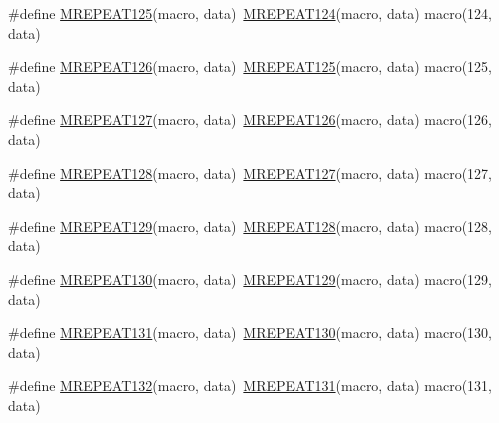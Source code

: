 \begin{DoxyCompactItemize}
\item 
\#define \mbox{\hyperlink{group__group__sam0__utils__mrepeat_ga7396c439515bd5514d070147e165690a}{M\+R\+E\+P\+E\+A\+T125}}(macro,  data)~\mbox{\hyperlink{group__group__sam0__utils__mrepeat_gaffd8596b4b1da63e7fa64cdeb5c91dd0}{M\+R\+E\+P\+E\+A\+T124}}(macro, data)   macro(124, data)
\item 
\#define \mbox{\hyperlink{group__group__sam0__utils__mrepeat_ga53040b0cd4095d945f277af00a28a94d}{M\+R\+E\+P\+E\+A\+T126}}(macro,  data)~\mbox{\hyperlink{group__group__sam0__utils__mrepeat_ga7396c439515bd5514d070147e165690a}{M\+R\+E\+P\+E\+A\+T125}}(macro, data)   macro(125, data)
\item 
\#define \mbox{\hyperlink{group__group__sam0__utils__mrepeat_gaebe40c87c802115261cb83ff47e7a2e6}{M\+R\+E\+P\+E\+A\+T127}}(macro,  data)~\mbox{\hyperlink{group__group__sam0__utils__mrepeat_ga53040b0cd4095d945f277af00a28a94d}{M\+R\+E\+P\+E\+A\+T126}}(macro, data)   macro(126, data)
\item 
\#define \mbox{\hyperlink{group__group__sam0__utils__mrepeat_ga932b04769d74272b98fbfe4d6c6e5f62}{M\+R\+E\+P\+E\+A\+T128}}(macro,  data)~\mbox{\hyperlink{group__group__sam0__utils__mrepeat_gaebe40c87c802115261cb83ff47e7a2e6}{M\+R\+E\+P\+E\+A\+T127}}(macro, data)   macro(127, data)
\item 
\#define \mbox{\hyperlink{group__group__sam0__utils__mrepeat_ga7842d9600b24d29d82636afa3f0ca4b8}{M\+R\+E\+P\+E\+A\+T129}}(macro,  data)~\mbox{\hyperlink{group__group__sam0__utils__mrepeat_ga932b04769d74272b98fbfe4d6c6e5f62}{M\+R\+E\+P\+E\+A\+T128}}(macro, data)   macro(128, data)
\item 
\#define \mbox{\hyperlink{group__group__sam0__utils__mrepeat_ga4191567eafa92f00f44b2d84415d6364}{M\+R\+E\+P\+E\+A\+T130}}(macro,  data)~\mbox{\hyperlink{group__group__sam0__utils__mrepeat_ga7842d9600b24d29d82636afa3f0ca4b8}{M\+R\+E\+P\+E\+A\+T129}}(macro, data)   macro(129, data)
\item 
\#define \mbox{\hyperlink{group__group__sam0__utils__mrepeat_ga6171f95e704d4bc6b92bca58bf15445c}{M\+R\+E\+P\+E\+A\+T131}}(macro,  data)~\mbox{\hyperlink{group__group__sam0__utils__mrepeat_ga4191567eafa92f00f44b2d84415d6364}{M\+R\+E\+P\+E\+A\+T130}}(macro, data)   macro(130, data)
\item 
\#define \mbox{\hyperlink{group__group__sam0__utils__mrepeat_ga70b3e029b2ca5370d287a710ba66cba3}{M\+R\+E\+P\+E\+A\+T132}}(macro,  data)~\mbox{\hyperlink{group__group__sam0__utils__mrepeat_ga6171f95e704d4bc6b92bca58bf15445c}{M\+R\+E\+P\+E\+A\+T131}}(macro, data)   macro(131, data)

\end{DoxyCompactItemize}
